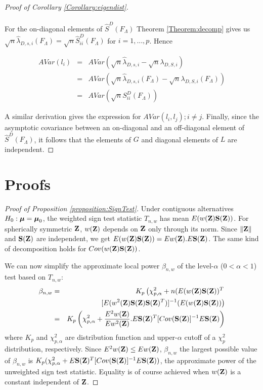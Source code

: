 \begin{proof}[Proof of Corollary \ref{Corollary:eigendist}]
\paragraph{}For the on-diagonal elements of $\hat S^D(F_\Lambda)$ Theorem \ref{Theorem:decomp} gives us $ \sqrt n \hat\lambda_{D,s,i} (F_\Lambda) = \sqrt n \hat S^D_{ii}(F_\Lambda)$ for $i = 1,...,p$. Hence

\begin{eqnarray*}
AVar(l_i) &=& AVar(\sqrt n \hat\lambda_{D,s,i} - \sqrt n \lambda_{D,S,i})\\
&=& AVar(\sqrt n \hat\lambda_{D,s,i} (F_\Lambda) - \sqrt n \lambda_{D,S,i}(F_\Lambda))\\
&=& AVar(\sqrt n S^D_{ii}(F_\Lambda))
\end{eqnarray*}

A similar derivation gives the expression for $AVar(l_i,l_j); i \neq j$. Finally, since the asymptotic covariance between an on-diagonal and an off-diagonal element of $\hat S^D(F_\Lambda)$, it follows that the elements of $G$ and diagonal elements of $L$ are independent.
\end{proof}

\section{Proofs}\label{section:appC}

\begin{proof}[Proof of Proposition \ref{proposition:SignTest}]
Under contiguous alternatives $H_0: {\boldsymbol{\mu}} = {\boldsymbol{\mu}}_0$, the weighted sign test statistic $T_{n,w}$ has mean $E (w({\mathbf{Z}}) {\mathbf{S}} ({\mathbf{Z}}))$. For spherically symmetric ${\mathbf{Z}}$, $w({\mathbf{Z}})$ depends on ${\mathbf{Z}}$ only through its norm. Since $\| {\mathbf{Z}} \|$ and ${\mathbf{S}}({\mathbf{Z}})$ are independent, we get $E (w({\mathbf{Z}}) {\mathbf{S}} ({\mathbf{Z}})) = E w({\mathbf{Z}}). E {\mathbf{S}} ({\mathbf{Z}})$. The same kind of decomposition holds for $Cov(w({\mathbf{Z}}) {\mathbf{S}}({\mathbf{Z}}))$.

We can now simplify the approximate local power $\beta_{n,w}$ of the level-$\alpha$ ($0 < \alpha < 1$) test based on $T_{n,w}$:
%
\begin{eqnarray*}
\beta_{n,w} &=& K_p \left( \chi^2_{p,\alpha} + n (E (w({\mathbf{Z}}) {\mathbf{S}} ({\mathbf{Z}}))^T \right.\\
&& \left. [ E (w^2({\mathbf{Z}}) {\mathbf{S}} ({\mathbf{Z}}) {\mathbf{S}} ({\mathbf{Z}})^T) ]^{-1} (E (w({\mathbf{Z}}) {\mathbf{S}} ({\mathbf{Z}})) \right)\\
&=& K_p \left( \chi^2_{p,\alpha} + \frac{E^2 w({\mathbf{Z}})}{Ew^2({\mathbf{Z}})}. E{\mathbf{S}}({\mathbf{Z}})^T [Cov({\mathbf{S}}({\mathbf{Z}})]^{-1} E{\mathbf{S}}({\mathbf{Z}}) \right)
\end{eqnarray*}
%
where $K_p$ and $\chi^2_{p,\alpha}$ are distribution function and upper-$\alpha$ cutoff of a $\chi^2_p$ distribution, respectively. Since $E^2 w({\mathbf{Z}}) \leq Ew({\mathbf{Z}})$, $\beta_{n,w}$ the largest possible value of $\beta_{n,w}$ is $K_p ( \chi^2_{p,\alpha} + E{\mathbf{S}}({\mathbf{Z}})^T [Cov({\mathbf{S}}({\mathbf{Z}})]^{-1} E{\mathbf{S}}({\mathbf{Z}}) )$, the approximate power of the unweighted sign test statistic. Equality is of course achieved when $w({\mathbf{Z}})$ is a constant independent of ${\mathbf{Z}}$.
\end{proof}

